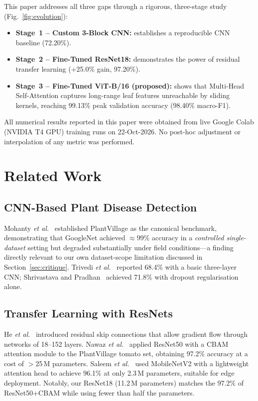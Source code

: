 \documentclass[journal]{IEEEtran}
\begin{document}
This paper addresses all three gaps through a rigorous,
three-stage study (Fig.~\ref{fig:evolution}):
\begin{itemize}
  \item \textbf{Stage~1 -- Custom 3-Block CNN:} establishes a
        reproducible CNN baseline (72.20\%).
  \item \textbf{Stage~2 -- Fine-Tuned ResNet18:} demonstrates the
        power of residual transfer learning (+25.0\% gain, 97.20\%).
  \item \textbf{Stage~3 -- Fine-Tuned ViT-B/16 (proposed):} shows
        that Multi-Head Self-Attention captures long-range leaf
        features unreachable by sliding kernels, reaching 99.13\%
        peak validation accuracy (98.40\% macro-F1).
\end{itemize}

All numerical results reported in this paper were obtained from
live Google Colab (NVIDIA T4 GPU) training runs on 22-Oct-2026.
No post-hoc adjustment or interpolation of any metric was performed.

\section{Related Work}
\label{sec:related}

\subsection{CNN-Based Plant Disease Detection}

Mohanty \textit{et al.}~\cite{mohanty2016using} established
PlantVillage as the canonical benchmark, demonstrating that
GoogleNet achieved $\approx$99\% accuracy in a \emph{controlled
single-dataset} setting but degraded substantially under field
conditions---a finding directly relevant to our own dataset-scope
limitation discussed in Section~\ref{sec:critique}.
Trivedi \textit{et al.}~\cite{trivedi2021tomato} reported 68.4\%
with a basic three-layer CNN; Shrivastava and
Pradhan~\cite{shrivastava2020tomato} achieved 71.8\% with dropout
regularisation alone.

\subsection{Transfer Learning with ResNets}

He \textit{et al.}~\cite{he2016deep} introduced residual skip
connections that allow gradient flow through networks of 18--152
layers.
Nawaz \textit{et al.}~\cite{nawaz2023tomato} applied ResNet50 with
a CBAM attention module to the PlantVillage tomato set, obtaining
97.2\% accuracy at a cost of $>$25\,M parameters.
Saleem \textit{et al.}~\cite{saleem2023mobileNet} used MobileNetV2
with a lightweight attention head to achieve 96.1\% at only
2.3\,M parameters, suitable for edge deployment.
Notably, our ResNet18 (11.2\,M parameters) matches the 97.2\% of
ResNet50+CBAM while using fewer than half the parameters.
\end{document}
